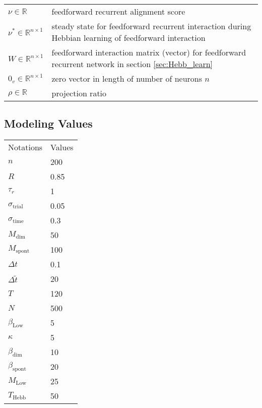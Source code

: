 \documentclass[11pt]{article}
\begin{document}
\begin{table}[H]
\begin{tabularx}{\textwidth}{lX}
			$\nu \in \mathbb{R}$ & feedforward recurrent alignment score\\
			
			$\nu^* \in \mathbb{R}^{n \times 1}$ & steady state for feedforward recurrent interaction during Hebbian learning of feedforward interaction \\
			
			$W \in \mathbb{R}^{n \times 1}$ & feedforward interaction matrix (vector) for feedforward recurrent network in section \ref{sec:Hebb_learn} \\
			
			
			$0_v \in \mathbb{R}^{n \times 1}$ & zero vector in length of number of neurons $n$ \\
			
			$\rho \in \mathbb{R}$ & projection ratio \\

		\end{tabularx}
	\end{table}
	
	
	\newpage
	\subsection{Modeling Values}

	\begin{table}[H]
		\begin{tabular}{ll}
			Notations \hspace{0.5cm} & Values \\
			$n$ & 200 \\
			$R$ & 0.85 \\
			$\tau_r$ & 1 \\
			$\sigma_{\text{trial}}$ & 0.05 \\
			$\sigma_{\text{time}}$ & 0.3 \\
			$M_{\text{dim}}$ & 50 \\
			$M_{\text{spont}}$ & 100\\
			$\Delta t$ & 0.1 \\
			$\Delta \tilde{t}$ & 20\\
			$T$ & 120\\
			$N$ & 500 \\
			$\beta_{\text{Low}}$ & 5\\
			$\kappa$ & 5\\
			$\beta_{\text{dim}}$ & 10\\
			$\beta_{\text{spont}}$ & 20\\
			$M_{\text{Low}}$ & 25\\
			$T_{\text{Hebb}}$ & 50 \\
			
		\end{tabular}
	\end{table}
	
\end{document}
